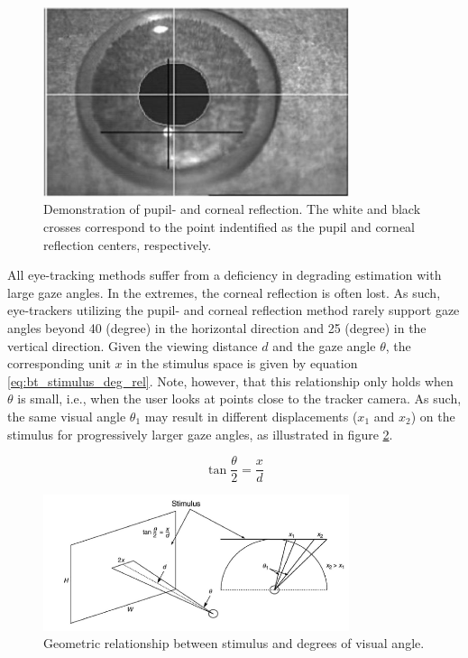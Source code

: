 \begin{figure}[h]
    \centering
    \includegraphics[width=0.8\textwidth]{figures/bt_pupil_corneal_reflection.png}
    \caption{Demonstration of pupil- and corneal reflection. The white and black crosses correspond to the point indentified as the pupil and corneal reflection centers, respectively.}
    \label{fig:bt_pupil_corneal_reflection}
\end{figure}

All eye-tracking methods suffer from a deficiency in degrading estimation with large gaze angles. In the extremes, the corneal reflection is often lost. As such, eye-trackers utilizing the pupil- and corneal reflection method rarely support gaze angles beyond 40 (degree) in the horizontal direction and 25 (degree) in the vertical direction. Given the viewing distance $d$ and the gaze angle $\theta$, the corresponding unit $x$ in the stimulus space is given by equation \ref{eq:bt_stimulus_deg_rel}. Note, however, that this relationship only holds when $\theta$ is small, i.e., when the user looks at points close to the tracker camera. As such, the same visual angle $\theta_1$ may result in different displacements ($x_1$ and $x_2$) on the stimulus for progressively larger gaze angles, as illustrated in figure \ref{fig:bt_stimulus_deg_rel}.

\begin{equation}
    \tan{\dfrac{\theta}{2}} = \dfrac{x}{d}
    \label{eq:bt_stimulus_deg_rel}
\end{equation}


\begin{figure}[h]
    \centering
    \includegraphics[width=0.8\textwidth]{figures/bt_angle_stimulus_relationship.png}
    \caption{Geometric relationship between stimulus and degrees of visual angle.}
    \label{fig:bt_stimulus_deg_rel}
\end{figure}

